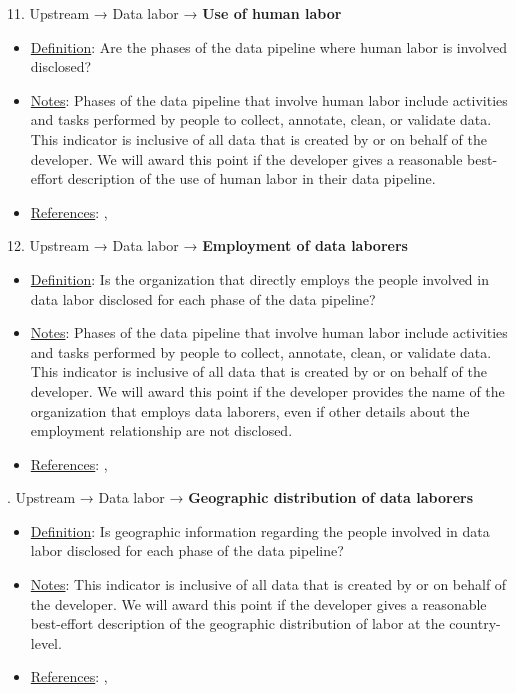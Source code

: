 11. Upstream → Data labor → \textbf{Use of human labor}
\vspace{-\parskip}
\begin{itemize}
\item
\underline{Definition}: Are the phases of the data pipeline where human labor is involved disclosed?
\item
\underline{Notes}: Phases of the data pipeline that involve human labor include activities and tasks performed by people to collect, annotate, clean, or validate data. This indicator is inclusive of all data that is created by or on behalf of the developer. We will award this point if the developer gives a reasonable best-effort description of the use of human labor in their data pipeline.
\item
\underline{References}: \citet{kittur2013future}, \citet{dzieza2023ai}
\end{itemize}


12. Upstream → Data labor → \textbf{Employment of data laborers}
\vspace{-\parskip}
\begin{itemize}
\item
\underline{Definition}: Is the organization that directly employs the people involved in data labor disclosed for each phase of the data pipeline?
\item
\underline{Notes}: Phases of the data pipeline that involve human labor include activities and tasks performed by people to collect, annotate, clean, or validate data. This indicator is inclusive of all data that is created by or on behalf of the developer. We will award this point if the developer provides the name of the organization that employs data laborers, even if other details about the employment relationship are not disclosed.
\item
\underline{References}: \citet{kittur2013future}, \citet{dzieza2023ai}
\end{itemize}


. Upstream → Data labor → \textbf{Geographic distribution of data laborers}
\vspace{-\parskip}
\begin{itemize}
\item
\underline{Definition}: Is geographic information regarding the people involved in data labor disclosed for each phase of the data pipeline?
\item
\underline{Notes}: This indicator is inclusive of all data that is created by or on behalf of the developer. We will award this point if the developer gives a reasonable best-effort description of the geographic distribution of labor at the country-level.
\item
\underline{References}: \citet{hao2023cleaning}, \citet{gray2019ghost}
\end{itemize}


